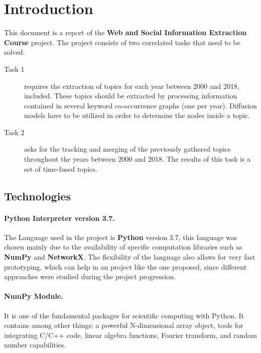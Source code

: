 \section{Introduction}
This document is a report of the \textbf{Web and Social Information Extraction Course} project.
The project consists of two correlated tasks that need to be solved:
\begin{description}
\item[Task 1] requires the extraction of topics for each year between 2000 and 2018, included. These topics should be extracted by processing information contained in several keyword co-occurrence graphs (one per year). Diffusion models have to be utilized in order to determine the nodes inside a topic.

\item[Task 2] asks for the tracking and merging of the previously gathered topics throughout the years between 2000 and 2018. The results of this task is a set of time-fused topics.
\end{description}

\subsection{Technologies}
\paragraph{\textbf{Python Interpreter version 3.7.}}
The Language used in the project is \textbf{Python} version 3.7, this language was chosen mainly due to the availability of specific computation libraries such as \textbf{NumPy} and \textbf{NetworkX}. The flexibility of the language also allows for very fast prototyping, which can help in an project like the one proposed, since different approaches were studied during the project progression.

\paragraph{\textbf{NumPy Module.}} It is one of the fundamental packages for scientific computing with Python. It contains among other things: a powerful N-dimensional array object, tools for integrating C/C++ code, linear algebra functions, Fourier transform, and random number capabilities.

